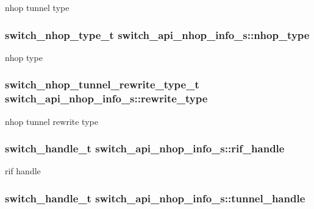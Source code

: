 nhop tunnel type \hypertarget{structswitch__api__nhop__info__s_ac0e8065a38b4877ea1e7549db444abe1}{
\subsubsection[{nhop\+\_\+type}]{\setlength{\rightskip}{0pt plus 5cm}switch\+\_\+nhop\+\_\+type\+\_\+t switch\+\_\+api\+\_\+nhop\+\_\+info\+\_\+s\+::nhop\+\_\+type}}\label{structswitch__api__nhop__info__s_ac0e8065a38b4877ea1e7549db444abe1}
nhop type \hypertarget{structswitch__api__nhop__info__s_a241421289b54d380336f4f1e5b97d32c}{
\subsubsection[{rewrite\+\_\+type}]{\setlength{\rightskip}{0pt plus 5cm}switch\+\_\+nhop\+\_\+tunnel\+\_\+rewrite\+\_\+type\+\_\+t switch\+\_\+api\+\_\+nhop\+\_\+info\+\_\+s\+::rewrite\+\_\+type}}\label{structswitch__api__nhop__info__s_a241421289b54d380336f4f1e5b97d32c}
nhop tunnel rewrite type \hypertarget{structswitch__api__nhop__info__s_a0f870d6d253058f7338d031300b4140a}{
\subsubsection[{rif\+\_\+handle}]{\setlength{\rightskip}{0pt plus 5cm}switch\+\_\+handle\+\_\+t switch\+\_\+api\+\_\+nhop\+\_\+info\+\_\+s\+::rif\+\_\+handle}}\label{structswitch__api__nhop__info__s_a0f870d6d253058f7338d031300b4140a}
rif handle \hypertarget{structswitch__api__nhop__info__s_a53aa868d98635cc58ec012a97c26b07f}{
\subsubsection[{tunnel\+\_\+handle}]{\setlength{\rightskip}{0pt plus 5cm}switch\+\_\+handle\+\_\+t switch\+\_\+api\+\_\+nhop\+\_\+info\+\_\+s\+::tunnel\+\_\+handle}}\label{structswitch__api__nhop__info__s_a53aa868d98635cc58ec012a97c26b07f}
